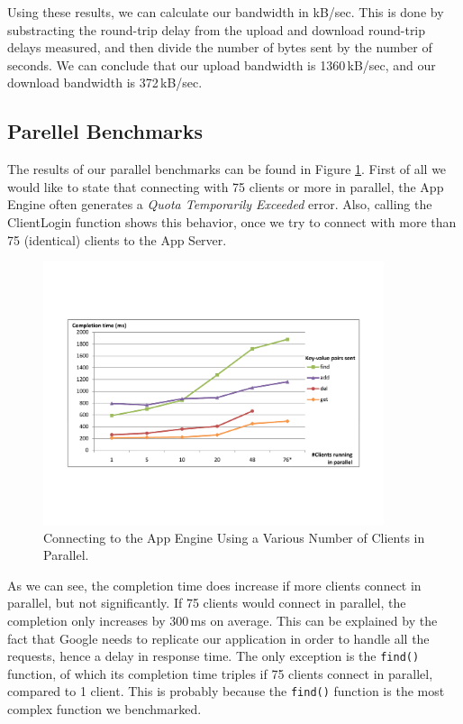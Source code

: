 Using these results, we can calculate our bandwidth in kB/sec. This is done by
substracting the round-trip delay from the upload and download round-trip delays
measured, and then divide the number of bytes sent by the number of seconds.
We can conclude that our upload bandwidth is 1360\,kB/sec, and our download
bandwidth is 372\,kB/sec.

\subsection{Parellel Benchmarks}
The results of our parallel benchmarks can be found in Figure
\ref{benchmarks-parallel-fig}. First of all we would like to state that
connecting with 75 clients or more in parallel, the App Engine often generates a
\emph{Quota Temporarily Exceeded} error. Also, calling the ClientLogin function
shows this behavior, once we try to connect with more than 75 (identical) clients
to the App Server.
 
\begin{figure} %
\begin{center}
\includegraphics[trim=5cm 4cm 5cm 5cm,width=10cm]{./figures/parallel.pdf}
\caption{Connecting to the App Engine Using a Various Number of Clients in
Parallel. \label{benchmarks-parallel-fig}}
\end{center}
\end{figure}
 
As we can see, the completion time does increase if more clients connect in
parallel, but not significantly. If 75 clients would connect in parallel, the
completion only increases by 300\,ms on average. This can be explained by the
fact that Google needs to replicate our application in order to handle all the
requests, hence a delay in response time. The only exception is the
\texttt{find()} function, of which its completion time triples if 75 clients
connect in parallel, compared to 1 client. This is probably because the
\texttt{find()} function is the most complex function we benchmarked.

